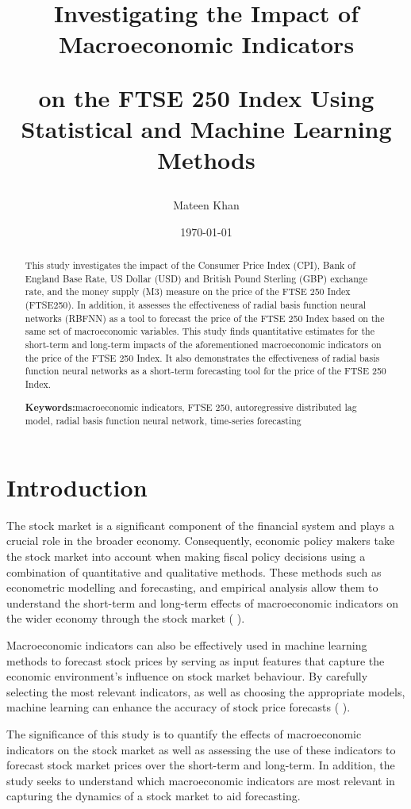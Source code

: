 \documentclass[11pt,a4paper]{article}
\title{Investigating the Impact of Macroeconomic Indicators

on the FTSE 250 Index Using Statistical and Machine Learning Methods}
\author{Mateen Khan}
\date{\today}
\providecommand{\keywordname}{\textbf{Keywords:}} %
\newcommand{\keywords}[1]{%
  \par\addvspace{\baselineskip}%
  \noindent\keywordname\enspace\ignorespaces#1 %
}
\newcommand{\citeboth}[1]{\citeauthor{#1} \citep{#1}}
\begin{document}
\maketitle

\begin{abstract}
    This study investigates the impact of the Consumer Price Index (CPI), Bank of England Base Rate, US Dollar (USD) and British Pound Sterling (GBP) exchange rate, and the money supply (M3) measure on the price of the FTSE 250 Index (FTSE250).
    In addition, it assesses the effectiveness of radial basis function neural networks (RBFNN) as a tool to forecast the price of the FTSE 250 Index based on the same set of macroeconomic variables. This study finds quantitative estimates for the short-term and long-term impacts of the aforementioned macroeconomic indicators on the price of the FTSE 250 Index. It also demonstrates the effectiveness of radial basis function neural networks as a short-term forecasting tool for the price of the FTSE 250 Index.
    \keywords{macroeconomic indicators, FTSE 250, autoregressive distributed lag model, radial basis function neural network, time-series forecasting}
\end{abstract}

\section{Introduction}

The stock market is a significant component of the financial system and 
plays a crucial role in the broader economy. Consequently, economic policy 
makers take the stock market into account when making fiscal policy 
decisions using a combination of quantitative and qualitative methods. 
These methods such as econometric modelling and forecasting, and empirical 
analysis allow them to understand the short-term and long-term effects of 
macroeconomic indicators
on the wider economy through the stock market (\citeboth{DemirgucKunt1996}).

Macroeconomic indicators can also be effectively used in machine learning 
methods to forecast stock prices by serving as input features that capture 
the economic environment’s influence on stock market behaviour. By carefully 
selecting the most relevant indicators, 
as well as choosing the appropriate models, machine learning can enhance the accuracy of stock price forecasts (\citeboth{Prasad2023}).

The significance of this study is to quantify the effects of macroeconomic indicators on the stock market as well as assessing the use of these indicators to forecast stock market prices over the short-term and long-term. In addition, the study seeks to understand which macroeconomic indicators are most relevant in capturing the dynamics of a stock market to aid forecasting.
\end{document}
